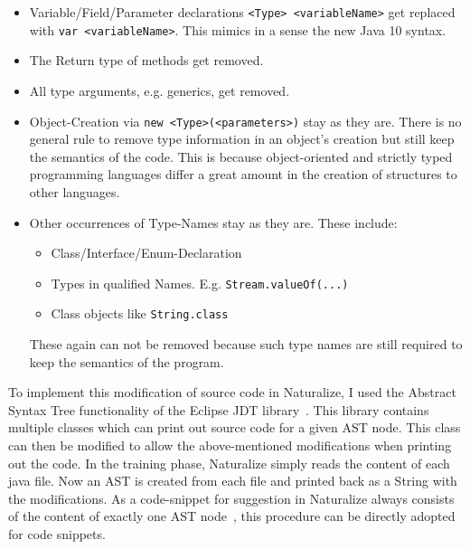 \begin{itemize}
    \item Variable/Field/Parameter declarations \texttt{<Type> <variableName>} get replaced with \texttt{var <variableName>}. This mimics in a sense the new Java 10 syntax.
    \item The Return type of methods get removed.
    \item All type arguments, e.g. generics, get removed.
    \item Object-Creation via \texttt{new <Type>(<parameters>)} stay as they are. There is no general rule to remove type information in an object's creation but still keep the semantics of the code. This is because object-oriented and strictly typed programming languages differ a great amount in the creation of structures to other languages.
    \item Other occurrences of Type-Names stay as they are. These include:
    \begin{itemize}
        \item Class/Interface/Enum-Declaration
        \item Types in qualified Names. E.g. \texttt{Stream.valueOf(...)}
        \item Class objects like \texttt{String.class}
    \end{itemize}
    These again can not be removed because such type names are still required to keep the semantics of the program.
\end{itemize}

To implement this modification of source code in Naturalize, I used the Abstract Syntax Tree functionality of the Eclipse JDT library~\cite{todo}. This library contains multiple classes which can print out source code for a given AST node. This class can then be modified to allow the above-mentioned modifications when printing out the code. In the training phase, Naturalize simply reads the content of each java file. Now an AST is created from each file and printed back as a String with the modifications. As a code-snippet for suggestion in Naturalize always consists of the content of exactly one AST node~\cite{naturalize}, this procedure can be directly adopted for code snippets.

